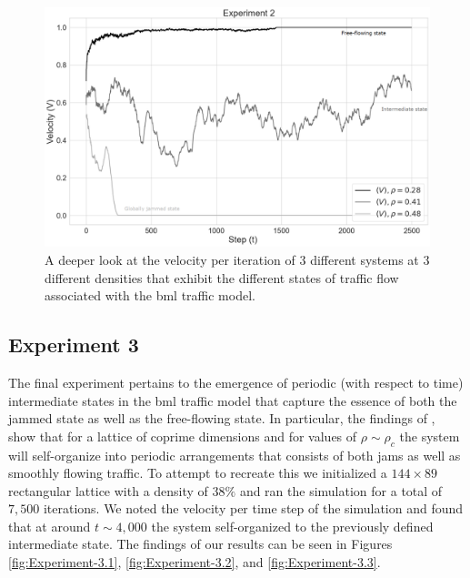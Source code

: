 \begin{figure}[H]
    \centering
    \includegraphics[width=\linewidth]{Images/Section 4/Experiment 2/2.4.pdf}
    \caption{A deeper look at the velocity per iteration of 3 different systems at 3 different densities that exhibit the different states of traffic flow associated with the \gls{bml} traffic model.}
    \label{fig:Experiment-2.4}
\end{figure}

\subsection{Experiment 3}
\label{subsec:Results-and-Discussion:Experiment-3}
The final experiment pertains to the emergence of periodic (with respect to time) intermediate states in the \gls{bml} traffic model that capture the essence of both the jammed state as well as the free-flowing state. In particular, the findings of \citeauthor{DSouza}, show that for a lattice of coprime dimensions and for values of $\rho \sim \rho_c$ the system will self-organize into periodic arrangements that consists of both jams as well as smoothly flowing traffic. To attempt to recreate this we initialized a $144 \times 89$ rectangular lattice with a density of $38\%$ and ran the simulation for a total of $7,500$ iterations. We noted the velocity per time step of the simulation and found that at around $t \sim 4,000$ the system self-organized to the previously defined intermediate state. The findings of our results can be seen in Figures \ref{fig:Experiment-3.1}, \ref{fig:Experiment-3.2}, and \ref{fig:Experiment-3.3}.

